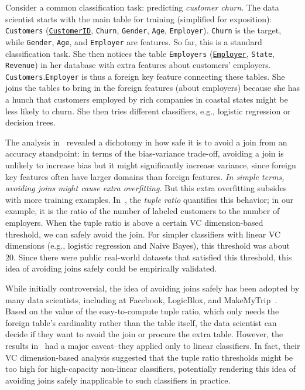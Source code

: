 \documentclass{vldb}
\begin{document}
\vspace{1mm}
Consider a common classification task: predicting \textit{customer 
churn}. The data scientist starts with the main table for training (simplified for exposition): 
\texttt{Customers} (\underline{\texttt{CustomerID}}, \texttt{Churn}, \texttt{Gender}, \texttt{Age}, 
\texttt{Employer}). \texttt{Churn} is the target, while \texttt{Gender}, \texttt{Age}, and
\texttt{Employer} are features. So far, this is a standard classification task. 
She then notices the table \texttt{Employers} (\underline{\texttt{Employer}}, \texttt{State}, 
\texttt{Revenue}) in her database with extra features about customers' employers.
\texttt{Customers}.\texttt{Employer} is thus a foreign key feature connecting these tables. 
She joins the tables to bring in the foreign features (about employers) because she has a hunch that 
customers employed by rich companies in coastal states might be less likely to churn. She then tries 
different classifiers, e.g., logistic regression or decision trees.

The analysis in~\cite{hamlet} revealed a dichotomy in how safe it is to avoid a join from an accuracy
standpoint: in terms of the bias-variance trade-off, avoiding a join is unlikely to increase bias but 
it might significantly increase variance, since foreign key features often have larger domains than 
foreign features. \textit{In simple terms, avoiding joins might cause extra overfitting}. 
But this extra overfitting subsides with more training examples. 
In~\cite{hamlet}, the \textit{tuple ratio} quantifies this behavior; in our example, it is the ratio of the 
number of labeled customers to the number of employers. When the tuple ratio is above a certain VC 
dimension-based threshold, we can safely avoid the join. 
For simpler classifiers with linear VC dimensions (e.g., logistic regression and Naive 
Bayes), this threshold was about $20$. Since there were public real-world datasets that satisfied this 
threshold, this idea of avoiding joins safely could be empirically validated. 

While initially controversial, the idea of avoiding joins safely has been adopted by many data scientists, 
including at Facebook, LogicBlox, and MakeMyTrip~\cite{perscomm}. Based on the value of the 
easy-to-compute tuple ratio, which only needs the foreign table's cardinality rather than the table itself, 
the data scientist can decide if they want to avoid the join or procure the extra table. However, the 
results in~\cite{hamlet} had a major caveat--they applied only to linear classifiers. In fact, their VC 
dimension-based analysis suggested that the tuple ratio thresholds might be too high for high-capacity 
non-linear classifiers, potentially rendering this idea of avoiding joins safely inapplicable to such
classifiers in practice.
\end{document}
